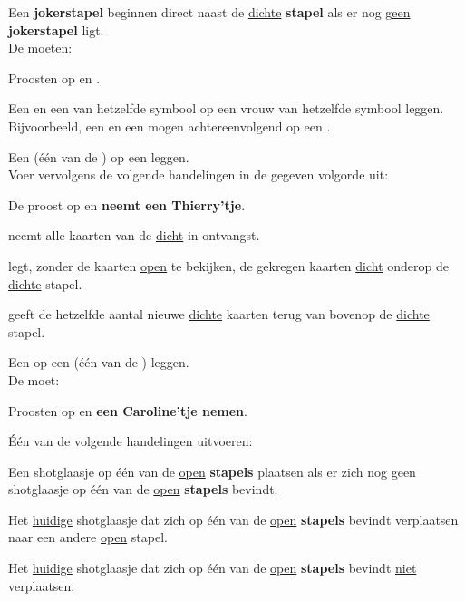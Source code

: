 \vervolgLijstKlein{}
\item \label{zet:joker_2} Een \textbf{jokerstapel} beginnen direct naast de \ul{dichte} \textbf{stapel} als er nog \ul{geen} \textbf{jokerstapel} ligt. \\De \andereSpelers moeten:
\puntLijst{}
\item Proosten op  en \FritsenN\footnotemark[2].
\eindPuntLijst{}
\eindLijst{}


\vervolgLijstKlein{}
\item \label{zet:dubbel} Een  en een  van hetzelfde symbool op een vrouw van hetzelfde symbool leggen. Bijvoorbeeld, een  en een  mogen achtereenvolgend op een .
\eindLijst{}


\vervolgLijstKlein{}
\item Een  (\'e\'en van de ) op een  leggen. \\Voer vervolgens de volgende handelingen in de gegeven volgorde uit:
\puntLijst{}
\item De \huidigeSpeler proost op  en \textbf{neemt een Thierry'tje}\footnotemark[3].
\item \Frits neemt alle kaarten van de \huidigeSpeler \ul{dicht} in ontvangst.
\item \Frits legt, zonder de kaarten \ul{open} te bekijken, de gekregen kaarten \ul{dicht} onderop de \ul{dichte} stapel.
\item \Frits geeft de \huidigeSpeler hetzelfde aantal nieuwe \ul{dichte} kaarten terug van bovenop de \ul{dichte} stapel.
\eindPuntLijst{}
\label{zet:thierry}
\eindLijst{}

\vervolgLijstKlein{}
\item Een  op een  (\'e\'en van de ) leggen. \\De \huidigeSpeler moet:
\puntLijst{}
\item Proosten op  en \textbf{een Caroline'tje nemen}\footnotemark[4].
\item Één van de volgende handelingen uitvoeren:
\numeriekeLijst{}
\item Een shotglaasje op \'e\'en van de \ul{open} \textbf{stapels} plaatsen als er zich nog geen shotglaasje op \'e\'en van de \ul{open} \textbf{stapels} bevindt.
\item Het \ul{huidige} shotglaasje dat zich op \'e\'en van de \ul{open} \textbf{stapels} bevindt verplaatsen naar een andere \ul{open} stapel.
\item Het \ul{huidige} shotglaasje dat zich op \'e\'en van de \ul{open} \textbf{stapels} bevindt \ul{niet} verplaatsen.
\eindNumeriekeLijst{}
\eindPuntLijst{}
\label{zet:caroline}
\eindLijst{}


